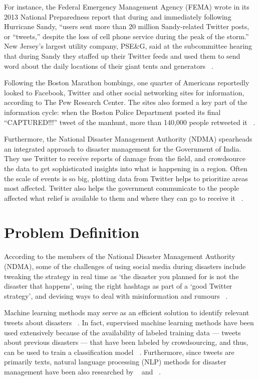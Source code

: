 For instance, the Federal Emergency Management Agency (FEMA) wrote in its 2013 National Preparedness report that during and immediately following Hurricane Sandy, “users sent more than 20 million Sandy-related Twitter posts, or “tweets,” despite the loss of cell phone service during the peak of the storm.” New Jersey’s largest utility company, PSE\&G, said at the subcommittee hearing that during Sandy they staffed up their Twitter feeds and used them to send word about the daily locations of their giant tents and generators ~\citep{scientificamer}.

Following the Boston Marathon bombings, one quarter of Americans reportedly looked to Facebook, Twitter and other social networking sites for information, according to The Pew Research Center. The sites also formed a key part of the information cycle: when the Boston Police Department posted its final “CAPTURED!!!” tweet of the manhunt, more than 140,000 people retweeted it ~\citep{scientificamer}.

Furthermore, the National Disaster Management Authority (NDMA) spearheads an integrated approach to disaster management for the Government of India. They use Twitter to receive reports of damage from the field, and crowdsource the data to get sophisticated insights into what is happening in a region. Often the scale of events is so big, plotting data from Twitter helps to prioritize areas most affected. Twitter also helps the government communicate to the people affected what relief is available to them and where they can go to receive it ~\citep{twittercrisisblog}.

\section{Problem Definition}
\label{problemdefinition}

According to the members of the National Disaster Management Authority (NDMA), some of the challenges of using social media during disasters include tweaking the strategy in real time as ‘the disaster you planned for is not the disaster that happens’, using the right hashtags as part of a ‘good Twitter strategy', and devising ways to deal with misinformation and rumours ~\citep{twittercrisisblog}.

Machine learning methods may serve as an efficient solution to identify relevant tweets about disasters ~\citep{tweedr}. In fact, supervised machine learning methods have been used extensively because of the availability of labeled training data --- tweets about previous disasters --- that have been labeled by crowdsourcing, and thus, can be used to train a classification model ~\citep{starbird}. Furthermore, since tweets are primarily texts, natural language processing (NLP) methods for disaster management have been also researched by ~\citep{sakaki} and ~\citep{terpstra}. 


